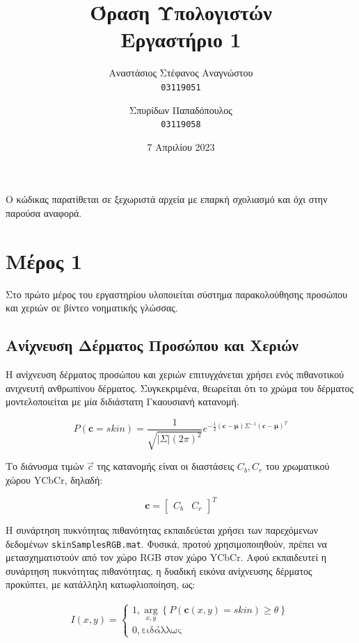 \documentclass{article}
\title{Όραση Υπολογιστών\\
\large Εργαστήριο 1}
\author{Αναστάσιος Στέφανος Αναγνώστου\\
    \texttt{03119051}
    \and
    Σπυρίδων Παπαδόπουλος\\
\texttt{03119058}}
\date{7 Απριλίου 2023}
\newcommand{\eng}[1]{\foreignlanguage{english}{#1}}
\begin{document}
\maketitle

\clearpage
\tableofcontents
\clearpage

Ο κώδικας παρατίθεται σε ξεχωριστά αρχεία με επαρκή σχολιασμό και όχι στην παρούσα αναφορά.

\section{Μέρος 1}

Στο πρώτο μέρος του εργαστηρίου υλοποιείται σύστημα παρακολούθησης προσώπου και χεριών σε βίντεο νοηματικής γλώσσας.

\subsection{Ανίχνευση Δέρματος Προσώπου και Χεριών}

Η ανίχνευση δέρματος προσώπου και χεριών επιτυγχάνεται χρήσει ενός πιθανοτικού ανιχνευτή ανθρωπίνου δέρματος. Συγκεκριμένα, θεωρείται ότι το χρώμα του δέρματος μοντελοποιείται με μία διδιάστατη Γκαουσιανή κατανομή.

\begin{equation}
    P(\pmb{c} = skin) = \frac{1}{\sqrt{\left| \Sigma \right| (2\pi)^2}}e^{-\frac{1}{2}(\pmb{c}-\pmb{\mu}) \Sigma^{-1}(\pmb{c}-\pmb{\mu})^{T}}
\end{equation}

Το διάνυσμα τιμών $\vec{c}$ της κατανομής είναι οι διαστάσεις $C_b, C_r$ του χρωματικού χώρου \eng{YCbCr}, δηλαδή:

\begin{equation}
    \pmb{c} = \begin{bmatrix} C_b & C_r \end{bmatrix}^{T} 
\end{equation}

Η συνάρτηση πυκνότητας πιθανότητας εκπαιδεύεται χρήσει των παρεχόμενων δεδομένων \texttt{\eng{skinSamplesRGB.mat}}. Φυσικά, προτού χρησιμοποιηθούν, πρέπει να μετασχηματιστούν από τον χώρο \eng{RGB} στον χώρο \eng{YCbCr}. Αφού εκπαιδευτεί η συνάρτηση πυκνότητας πιθανότητας, η δυαδική εικόνα ανίχνευσης δέρματος προκύπτει, με κατάλληλη κατωφλιοποίηση, ως:

\begin{equation}
    \begin{gathered}
        I(x, y) =
        \begin{cases}
            1, \underset{x, y}{\arg} \left\{P(\pmb{c}(x, y) = skin)\ge \theta\right\} \\
            0, \text{ειδάλλως}
        \end{cases}
    \end{gathered}
\end{equation}
\end{document}
